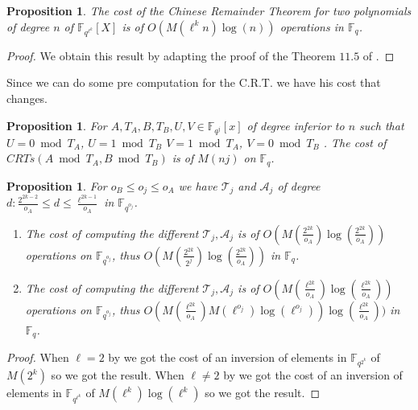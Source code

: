 \documentclass{lms}
\newtheorem{prop}[thm]{Proposition}
\begin{document}
\begin{prop}
The cost of the Chinese Remainder Theorem for two polynomials of degree $n$ of $\mathbb{F}_{q^{\ell^k}}[X] $ is of $O(M(\ell^kn)\log(n))$ operations in $\mathbb{F}_q$.
\end{prop}

\begin{proof}
We obtain this result by adapting the proof of the Theorem $11.5$ of \cite{vzGG}.
\end{proof}

Since we can do some pre computation for the C.R.T. we have his cost that changes. 

\begin{prop}
For $A, T_A,B, T_B,U,V \in \mathbb{F}_{q^{j}}[x]$ of degree inferior to $n$ such that $U=0 \bmod T_A$, $U=1 \bmod T_B$ $V=1 \bmod T_A$, $V=0 \bmod T_B$ . The cost of $CRTs(A \bmod T_A,B\bmod T_B)$ is of $M(nj)$ on $\mathbb{F}_q$.
\end{prop}

\begin{prop}
For $ o_{B} \leqslant o_j \leqslant o_{A}$ we have $\mathcal{T}_j$ and $\mathcal{A}_j$ of degree $d: \frac{2^{2k-2}}{o_{A}}  \leqslant d \leqslant \frac{\ell^{2k-1}}{o_{A}}$ in $\mathbb{F}_{q^{o_j}}$. 
\begin{enumerate}
\item[$\ell=2$] The cost of computing the different $\mathcal{T}_j,\mathcal{A}_j$ is of $O(M(\frac{2^{2k}}{o_{A}})\log(\frac{2^{2k}}{o_{A}}))$ operations on $\mathbb{F}_{q^{o_j}}$, thus $O(M(\frac{2^{2k}}{2^j})\log(\frac{2^{2k}}{o_{A}}))$ in $\mathbb{F}_q$. 
\item[$\ell \neq 2$]The cost of computing the different $\mathcal{T}_j,\mathcal{A}_j$ is of $O(M(\frac{\ell^{2k}}{o_{A}})\log(\frac{\ell^{2k}}{o_{A}}))$ operations on $\mathbb{F}_{q^{o_j}}$, thus $O(M(\frac{\ell^{2k}}{o_{A}})M(\ell^{o_j}) \log(\ell^{o_j}))\log(\frac{\ell^{2k}}{o_{A}}))$ in $\mathbb{F}_q$. %
\end{enumerate}
\end{prop}

\begin{proof}
When $\ell=2$ by \cite{DoSc12} we got the cost of an inversion of elements in $\mathbb{F}_{q^{2^k}}$ of $M(2^k)$ so we got the result. When $\ell \neq 2$ by \cite{DeDoSc13} we got the cost of an inversion of elements in $\mathbb{F}_{q^{\ell^k}}$ of $M(\ell^k)\log(\ell^k)$ so we got the result.
\end{proof}
\end{document}
